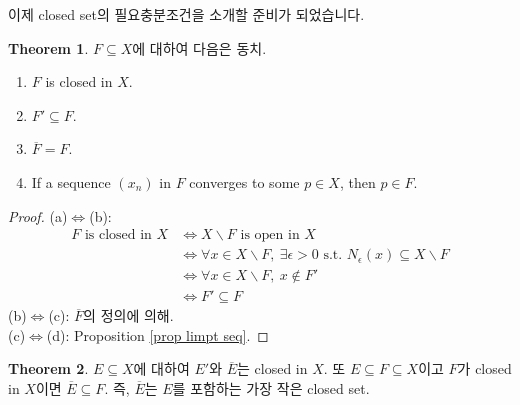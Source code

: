 \documentclass[12pt]{article}
\theoremstyle{definition}
\newtheorem{thm}{Theorem}[section]
\begin{document}
이제 closed set의 필요충분조건을 소개할 준비가 되었습니다.

	\begin{thm}
		\(F \subseteq X\)에 대하여 다음은 동치.
		\begin{enumerate}[label=(\alph*), leftmargin=2\parindent]
			\item
			\(F\) is closed in \(X\).
			\item
			\(F' \subseteq F\).
			\item
			\(\overline{F} = F\).
			\item
			If a sequence \((x_n)\) in \(F\) converges to some \(p \in X\), then \(p \in F\).
		\end{enumerate}
	\end{thm}

	\begin{proof}
		(a)\(\Leftrightarrow\)(b):
		\begin{align*}
			F \text{ is closed in } X & \Leftrightarrow X \backslash F \text{ is open in } X\\
			& \Leftrightarrow \forall x \in X \backslash F, \: \exists \epsilon > 0 \text{ s.t. } N_\epsilon (x) \subseteq X \backslash F\\
			& \Leftrightarrow \forall x \in X \backslash F, \: x \notin F'\\
			& \Leftrightarrow F' \subseteq F
		\end{align*}
		(b)\(\Leftrightarrow\)(c): \(\overline{F}\)의 정의에 의해.\\
		(c)\(\Leftrightarrow\)(d): Proposition \ref{prop limpt seq}.
	\end{proof}

	\begin{thm}
		\(E \subseteq X\)에 대하여 \(E'\)와 \(\overline{E}\)는 closed in \(X\). 또 \(E \subseteq F \subseteq X\)이고 \(F\)가 closed in \(X\)이면 \(\overline{E} \subseteq F\). 즉, \(\overline{E}\)는 \(E\)를 포함하는 가장 작은 closed set.
	\end{thm}
\end{document}
